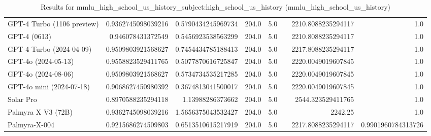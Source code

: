 \begin{table}[htp]
{\begin{tabular}{lrrrrrrr}
GPT-4 Turbo (1106 preview) & 0.9362745098039216 & 0.5790434245969734 & 204.0 & 5.0 &  & 2210.8088235294117 & 1.0 \\
GPT-4 (0613) & 0.946078431372549 & 0.5456923538563299 & 204.0 & 5.0 &  & 2210.8088235294117 & 1.0 \\
GPT-4 Turbo (2024-04-09) & 0.9509803921568627 & 0.7454434785188413 & 204.0 & 5.0 &  & 2217.8088235294117 & 1.0 \\
GPT-4o (2024-05-13) & 0.9558823529411765 & 0.5077870616725847 & 204.0 & 5.0 &  & 2220.0049019607845 & 1.0 \\
GPT-4o (2024-08-06) & 0.9509803921568627 & 0.5734734535217285 & 204.0 & 5.0 &  & 2220.0049019607845 & 1.0 \\
GPT-4o mini (2024-07-18) & 0.9068627450980392 & 0.3674813041500017 & 204.0 & 5.0 &  & 2220.0049019607845 & 1.0 \\
Solar Pro & 0.8970588235294118 & 1.13988286373662 & 204.0 & 5.0 &  & 2544.323529411765 & 1.0 \\
Palmyra X V3 (72B) & 0.9362745098039216 & 1.5656375043532427 & 204.0 & 5.0 &  & 2242.25 & 1.0 \\
Palmyra-X-004 & 0.9215686274509803 & 0.6513510615217919 & 204.0 & 5.0 &  & 2217.8088235294117 & 0.9901960784313726 \\
\bottomrule
\end{tabular}}
\caption{Results for mmlu_high_school_us_history_subject:high_school_us_history (mmlu_high_school_us_history)}
\label{fig:mmlu_high_school_us_history_subject:high_school_us_history (mmlu_high_school_us_history)}
\end{table}